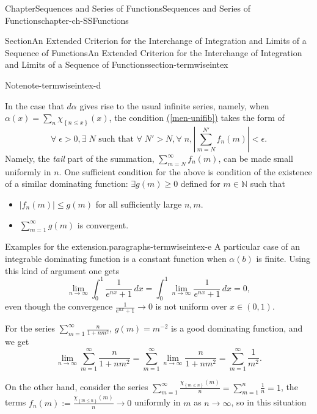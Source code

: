 \documentclass[oneside,10pt,]{book}
\newcommand{\xreffont}{\relax}
\numberwithin{equation}{section}
\begin{document}
\begin{chapterptx}{Chapter}{Sequences and Series of Functions}{}{Sequences and Series of Functions}{}{}{chapter-ch-SSFunctions}
\begin{sectionptx}{Section}{An Extended Criterion for the Interchange of Integration and Limits  of a Sequence of Functions}{}{An Extended Criterion for the Interchange of Integration and Limits  of a Sequence of Functions}{}{}{section-termwiseintex}
\begin{note}{Note}{}{note-termwiseintex-d}
\begin{itemize}[label=\textbullet]
\end{itemize}
%
\par
In the case that \(d\alpha\) gives rise to the usual infinite series, namely, when \(\alpha (x) =\sum_{n} \chi_{\left\{n\le x\right\}}(x)\), the condition \hyperref[men-unifib]{({\xreffont\ref{men-unifib}})} takes the form of%
\begin{equation*}
\forall \;\epsilon >0, \exists\; N \text{ such that } \forall \; N'>N, 
\forall \;n,  \left| \sum_{m=N}^{N'} f_{n}(m) \right| < \epsilon.
\end{equation*}
Namely, the \emph{tail} part of the summation, \(\sum_{m=N}^{\infty} f_{n}(m)\), can be made small uniformly in \(n\).  One sufficient condition for the above is condition of the existence of a similar dominating function: \(\exists g(m)\ge 0\) defined for \(m\in \mathbb N\) such that%
\begin{itemize}[label=\textbullet]
\item{}\(|f_{n}(m)|\le g(m) \)  for all sufficiently large \(n, m.\)%
\item{}\(\sum_{m=1}^{\infty} g(m) \) is convergent.%
\end{itemize}
%
\end{note}
\begin{paragraphs}{Examples for the extension.}{paragraphs-termwiseintex-e}%
A particular case of an integrable dominating function is a constant function when \(\alpha (b)\) is finite. Using this kind of argument one gets%
\begin{equation*}
\lim_{n\to \infty}\int_{0}^{1}\frac{1}{e^{nx}+1}\, dx = \int_{0}^{1}\lim_{n\to \infty} \frac{1}{e^{nx}+1}\, dx=0,
\end{equation*}
even though the convergence \(\frac{1}{e^{nx}+1} \to 0\) is not uniform over \(x\in (0, 1)\).%
\par
For the series \(\sum_{m=1}^{\infty}\frac{n}{1+n m^{2}}\), \(g(m)=m^{-2}\) is a good dominating function, and we get%
\begin{equation*}
\lim_{n\to \infty}	\sum_{m=1}^{\infty}\frac{n}{1+n m^{2}}
= \sum_{m=1}^{\infty}\lim_{n\to \infty}\frac{n}{1+n m^{2}}= \sum_{m=1}^{\infty}\frac{1}{m^{2}}.
\end{equation*}
%
\par
On the other hand, consider the series \(\sum_{m=1}^{\infty}\frac{\chi_{\left\{m\le n\right\}}(m)}{n}
=\sum_{m=1}^{n}\frac{1}{n}=1\), the terms \(f_{n}(m) := \frac{\chi_{\left\{m\le n\right\}}(m)}{n} \to 0\) uniformly in \(m\) as \(n\to \infty\), so in this situation%
\begin{equation*}

\end{equation*}
\end{paragraphs}
\end{sectionptx}
\end{chapterptx}
\end{document}
